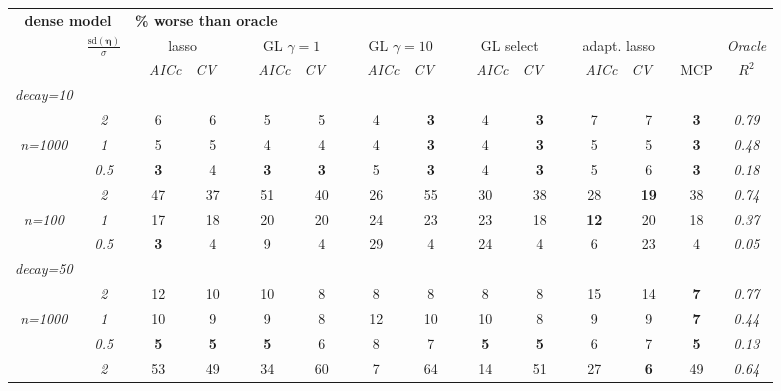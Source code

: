 

\begin{table}
\footnotesize
\begin{center}
\begin{tabular}{cc|cc|cc|cc|cc|cc|c|c}
\multicolumn{2}{c|}{\bf dense model} & \multicolumn{11}{l|}{\bf \% worse than oracle } & \\[1ex]
& \multirow{2}{*}{$\displaystyle\frac{\mathrm{sd}(\boldsymbol{\eta})}{\sigma}$} 
& \multicolumn{2}{c}{lasso} 
& \multicolumn{2}{c}{GL $\gamma=1$} 
& \multicolumn{2}{c}{GL $\gamma=10$} 
& \multicolumn{2}{c}{GL select} 
& \multicolumn{2}{c}{ adapt. lasso} 
& \multicolumn{1}{c|}{~} & \it Oracle \\[-0.5ex]
& 
& ~~\scriptsize\it AICc & \multicolumn{1}{c}{\scriptsize\it CV~~}
& ~~\scriptsize\it AICc & \multicolumn{1}{c}{\scriptsize\it CV~~}
& ~~\scriptsize\it AICc & \multicolumn{1}{c}{\scriptsize\it CV~~}
& ~~\scriptsize\it AICc & \multicolumn{1}{c}{\scriptsize\it CV~~}
& ~~\scriptsize\it AICc & \multicolumn{1}{c}{\scriptsize\it CV~~} 
& \multicolumn{1}{c|}{ MCP} & $R^2$ \\[1ex]
\hline\rule{0pt}{3ex}
{\it decay=10} &&&&&&&&&&&&\\
& \it  2  & 6 & 6 & 5 & 5 & 4 & {\bf 3} & 4 & {\bf 3} & 7 & 7 & {\bf 3} & \it  0.79 \\
\it n=1000  & \it  1  & 5 & 5 & 4 & 4 & 4 & {\bf 3} & 4 & {\bf 3} & 5 & 5 & {\bf 3} & \it  0.48 \\
& \it  0.5  & {\bf 3} & 4 & {\bf 3} & {\bf 3} & 5 & {\bf 3} & 4 & {\bf 3} & 5 & 6 & {\bf 3} & \it  0.18 \\[1ex]
\cline{2-2}\rule{0pt}{3ex}& \it  2  & 47 & 37 & 51 & 40 & 26 & 55 & 30 & 38 & 28 & {\bf 19} & 38 & \it  0.74 \\
\it n=100  & \it  1  & 17 & 18 & 20 & 20 & 24 & 23 & 23 & 18 & {\bf 12} & 20 & 18 & \it  0.37 \\
& \it  0.5  & {\bf 3} & 4 & 9 & 4 & 29 & 4 & 24 & 4 & 6 & 23 & 4 & \it  0.05 \\[1ex]
\hline\rule{0pt}{3ex}{\it decay=50} &&&&&&&&&&&&\\
& \it  2  & 12 & 10 & 10 & 8 & 8 & 8 & 8 & 8 & 15 & 14 & {\bf 7} & \it  0.77 \\
\it n=1000  & \it  1  & 10 & 9 & 9 & 8 & 12 & 10 & 10 & 8 & 9 & 9 & {\bf 7} & \it  0.44 \\
& \it  0.5  & {\bf 5} & {\bf 5} & {\bf 5} & 6 & 8 & 7 & {\bf 5} & {\bf 5} & 6 & 7 & {\bf 5} & \it  0.13 \\[1ex]
\cline{2-2}\rule{0pt}{3ex}& \it  2  & 53 & 49 & 34 & 60 & 7 & 64 & 14 & 51 & 27 & {\bf 6} & 49 & \it  0.64 \\

\end{tabular}
\end{center}
\end{table}
